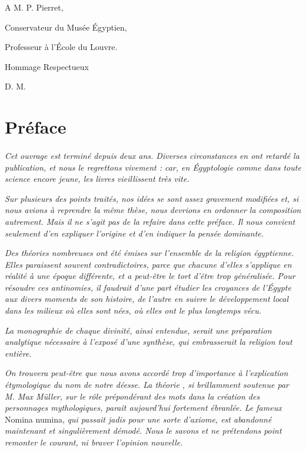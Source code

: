 \documentclass[a4paper, 11pt, oneside]{article}
\begin{document}
\setlength{\parskip}{1mm plus1mm minus1mm}
\clearpage
\tableofcontents
\clearpage
\Large
\vspace*{\fill}
A M. P. Pierret,

Conservateur du Musée Égyptien,

Professeur à l'École du Louvre.

Hommage Respectueux

D. M.
\vspace*{\fill}
\clearpage
\section*{Préface}
\paragraph{}
\emph{Cet ouvrage est terminé depuis deux ans. Diverses circonstances en ont retardé la publication, et nous le regrettons vivement : car, en Égyptologie comme dans toute science encore jeune, les livres vieillissent très vite.}

\emph{Sur plusieurs des points traités, nos idées se sont assez gravement modifiées et, si nous avions à reprendre la même thèse, nous devrions en ordonner la composition autrement. Mais il ne s'agit pas de la refaire dans cette préface. Il nous convient seulement d'en expliquer l'origine et d'en indiquer la pensée dominante.}

\emph{Des théories nombreuses ont été émises sur l'ensemble de la religion égyptienne. Elles paraissent souvent contradictoires, parce que chacune d'elles s'applique en réalité à une époque différente, et a peut-être le tort d'être trop généralisée. Pour résoudre ces antinomies, il faudrait d'une part étudier les croyances de l'Égypte aux divers moments de son histoire, de l'autre en suivre le développement local dans les milieux où elles sont nées, où elles ont le plus longtemps vécu.}

\emph{La monographie de chaque divinité, ainsi entendue, serait une préparation analytique nécessaire à l'exposé d'une synthèse, qui embrasserait la religion tout entière.}

\emph{On trouvera peut-être que nous avons accordé trop d'importance à l'explication étymologique du nom de notre déesse. La théorie , si brillamment soutenue par M. Max Müller, sur le rôle prépondérant des mots dans la création des personnages mythologiques, paraît aujourd'hui fortement ébranlée. Le fameux} Nomina numina, \emph{qui passait jadis pour une sorte d'axiome, est abandonné maintenant et singulièrement démodé. Nous le savons et ne prétendons point remonter le courant, ni braver l'opinion nouvelle.}
\end{document}
